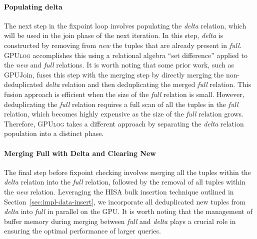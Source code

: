 \documentclass[nonacm,sigplan]{acmart}
\newcommand{\tool}{\textsc{GPUlog}}
\newcommand{\shovon}[1]{{\textcolor{green}{\{\textbf{Shovon}: #1\}}}}
\newcommand{\revised}[1]{{#1}}
\begin{document}
\paragraph*{Populating delta}
\label{sect:pop-delta}
The next step in the fixpoint loop involves populating the \textit{delta} relation, which will be used in the join phase of the next iteration. \revised{In this step, \textit{delta} is constructed by removing from \textit{new} the tuples that are already present in \textit{full}.} \tool{} accomplishes this using a relational algebra ``set difference'' applied to the \textit{new} and \textit{full} relations.
It is worth noting that some prior work, such as GPUJoin, fuses this step with the merging step by directly merging the non-deduplicated \textit{delta} relation and then deduplicating the merged \textit{full} relation. This fusion approach is efficient when the size of the \textit{full} relation is small. However, deduplicating the \textit{full} relation requires a full scan of all the tuples in the \textit{full} relation, which becomes highly expensive as the size of the \textit{full} relation grows. Therefore, \tool{} takes a different approach by separating the \textit{delta} relation population into a distinct phase.

\paragraph*{Merging Full with Delta and Clearing New}
The final step before fixpoint checking involves merging all the tuples within the \textit{delta} relation into the \textit{full} relation, followed by the removal of all tuples within the \textit{new} relation. Leveraging the HISA bulk insertion technique outlined in Section~\ref{sec:impl-data-insert}, we incorporate all deduplicated new tuples from \textit{delta} into \textit{full} in parallel on the GPU.
It is worth noting that the management of buffer memory during merging between \textit{full} and \textit{delta} plays a crucial role in ensuring the optimal performance of larger queries. %

\end{document}
